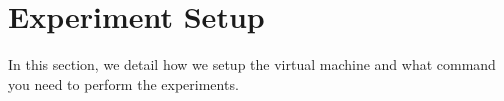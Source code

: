 \section{Experiment Setup}
In this section, we detail how we setup the virtual machine and what command you need to perform the experiments.